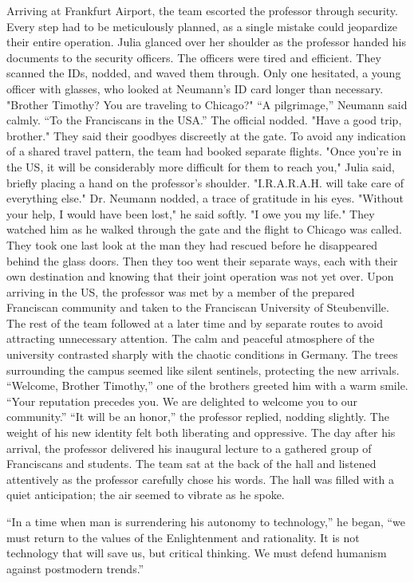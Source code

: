 \documentclass[
]{article}
\begin{document}
Arriving at Frankfurt Airport, the team escorted the professor through security. Every step had to be meticulously planned, as a single mistake could jeopardize their entire operation. Julia glanced over her shoulder as the professor handed his documents to the security officers. The officers were tired and efficient. They scanned the IDs, nodded, and waved them through.
Only one hesitated, a young officer with glasses, who looked at Neumann's ID card longer than necessary.
"Brother Timothy? You are traveling to Chicago?"
“A pilgrimage,” Neumann said calmly. “To the Franciscans in the USA.”
The official nodded. "Have a good trip, brother."
They said their goodbyes discreetly at the gate. To avoid any indication of a shared travel pattern, the team had booked separate flights. "Once you're in the US, it will be considerably more difficult for them to reach you," Julia said, briefly placing a hand on the professor's shoulder. "I.R.A.R.A.H. will take care of everything else."
Dr. Neumann nodded, a trace of gratitude in his eyes. "Without your help, I would have been lost," he said softly. "I owe you my life."
They watched him as he walked through the gate and the flight to Chicago was called. They took one last look at the man they had rescued before he disappeared behind the glass doors. Then they too went their separate ways, each with their own destination and knowing that their joint operation was not yet over.
Upon arriving in the US, the professor was met by a member of the prepared Franciscan community and taken to the Franciscan University of Steubenville. The rest of the team followed at a later time and by separate routes to avoid attracting unnecessary attention. The calm and peaceful atmosphere of the university contrasted sharply with the chaotic conditions in Germany. The trees surrounding the campus seemed like silent sentinels, protecting the new arrivals.
“Welcome, Brother Timothy,” one of the brothers greeted him with a warm smile. “Your reputation precedes you. We are delighted to welcome you to our community.”
“It will be an honor,” the professor replied, nodding slightly. The weight of his new identity felt both liberating and oppressive.
The day after his arrival, the professor delivered his inaugural lecture to a gathered group of Franciscans and students. The team sat at the back of the hall and listened attentively as the professor carefully chose his words. The hall was filled with a quiet anticipation; the air seemed to vibrate as he spoke.

``In a time when man is surrendering his autonomy to technology,'' he began, ``we must return to the values \hspace{0pt}\hspace{0pt}of the Enlightenment and rationality. It is not technology that will save us, but critical thinking. We must defend humanism against postmodern trends.''
\end{document}
